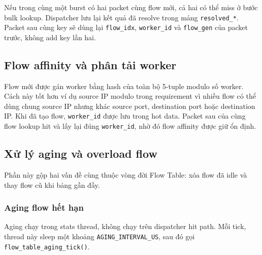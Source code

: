 \documentclass[12pt,a4paper]{report}
\DeclareRobustCommand{\code}[1]{{\small\texttt{#1}}}
\begin{document}
Nếu trong cùng một burst có hai packet cùng flow mới, cả hai có thể miss ở bước bulk lookup. Dispatcher lưu lại kết quả đã resolve trong mảng \code{resolved\_*}. Packet sau cùng key sẽ dùng lại \code{flow\_idx}, \code{worker\_id} và \code{flow\_gen} của packet trước, không add key lần hai.

\subsection{Flow affinity và phân tải worker}

Flow mới được gán worker bằng hash của toàn bộ 5-tuple modulo số worker. Cách này tốt hơn ví dụ source IP modulo trong requirement vì nhiều flow có thể dùng chung source IP nhưng khác source port, destination port hoặc destination IP. Khi đã tạo flow, \code{worker\_id} được lưu trong hot data. Packet sau của cùng flow lookup hit và lấy lại đúng \code{worker\_id}, nhờ đó flow affinity được giữ ổn định.

\subsection{Xử lý aging và overload flow}

Phần này gộp hai vấn đề cùng thuộc vòng đời Flow Table: xóa flow đã idle và thay flow cũ khi bảng gần đầy.

\subsubsection{Aging flow hết hạn}

Aging chạy trong stats thread, không chạy trên dispatcher hit path. Mỗi tick, thread này sleep một khoảng \code{AGING\_INTERVAL\_US}, sau đó gọi \code{flow\_table\_aging\_tick()}.
\end{document}
